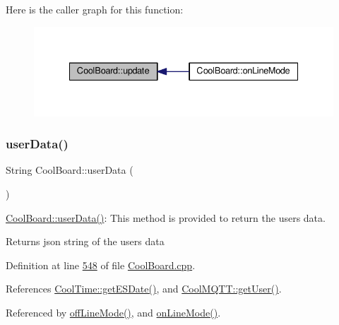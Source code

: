 Here is the caller graph for this function\+:
\nopagebreak
\begin{figure}[H]
\begin{center}
\leavevmode
\includegraphics[width=335pt]{class_cool_board_a8612756d3f73198cdde857a66f0fe690_icgraph}
\end{center}
\end{figure}
\mbox{\label{class_cool_board_ae7358fb6e623cfc81b775f5f1734909b}} 
\subsubsection{\texorpdfstring{user\+Data()}{userData()}}
{\footnotesize\ttfamily String Cool\+Board\+::user\+Data (\begin{DoxyParamCaption}{ }\end{DoxyParamCaption})}

\hyperlink{class_cool_board_ae7358fb6e623cfc81b775f5f1734909b}{Cool\+Board\+::user\+Data()}\+: This method is provided to return the user\textquotesingle{}s data.

\begin{DoxyReturn}{Returns}
json string of the user\textquotesingle{}s data 
\end{DoxyReturn}


Definition at line \hyperlink{_cool_board_8cpp_source_l00548}{548} of file \hyperlink{_cool_board_8cpp_source}{Cool\+Board.\+cpp}.



References \hyperlink{_cool_time_8cpp_source_l00101}{Cool\+Time\+::get\+E\+S\+Date()}, and \hyperlink{_cool_m_q_t_t_8cpp_source_l00375}{Cool\+M\+Q\+T\+T\+::get\+User()}.



Referenced by \hyperlink{_cool_board_8cpp_source_l00187}{off\+Line\+Mode()}, and \hyperlink{_cool_board_8cpp_source_l00097}{on\+Line\+Mode()}.


